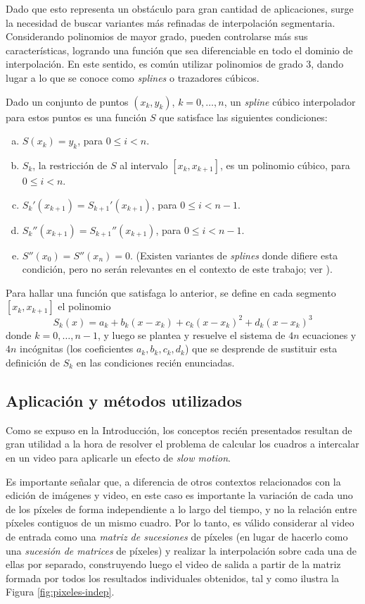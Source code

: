     Dado que esto representa un obstáculo para gran cantidad de aplicaciones, surge la necesidad de buscar variantes más refinadas de interpolación segmentaria. Considerando polinomios de mayor grado, pueden controlarse más sus características, logrando una función que sea diferenciable en todo el dominio de interpolación. En este sentido, es común utilizar polinomios de grado 3, dando lugar a lo que se conoce como \emph{splines} o trazadores cúbicos.

    Dado un conjunto de puntos $(x_k, y_k)$, $k = 0, \dots, n$, un \emph{spline} cúbico interpolador para estos puntos es una función $S$ que satisface las siguientes condiciones:

    \begin{enumerate}[(a)] \setlength{\leftskip}{2em}
      \item $S(x_k) = y_k$, para $0 \leq i < n$.
      \item $S_k$, la restricción de $S$ al intervalo $[x_k, x_{k+1}]$, es un polinomio cúbico, para $0 \leq i < n$.
      \item $S_k'(x_{k+1}) = S_{k+1}'(x_{k+1})$, para $0 \leq i < n - 1$.
      \item $S_k''(x_{k+1}) = S_{k+1}''(x_{k+1})$, para $0 \leq i < n - 1$.
      \item $S''(x_0) = S''(x_n) = 0$. (Existen variantes de \emph{splines} donde difiere esta condición, pero no serán relevantes en el contexto de este trabajo; ver \cite[p. 146]{Burden}).
    \end{enumerate}

    Para hallar una función que satisfaga lo anterior, se define en cada segmento $[x_k, x_{k+1}]$ el polinomio
      \[ S_k(x) = a_k + b_k (x - x_k) + c_k (x - x_k)^2 + d_k (x - x_k)^3 \]
    donde $k = 0, \dots, n-1$, y luego se plantea y resuelve el sistema de $4n$ ecuaciones y $4n$ incógnitas (los coeficientes $a_k, b_k, c_k, d_k$) que se desprende de sustituir esta definición de $S_k$ en las condiciones recién enunciadas.

  \subsection{Aplicación y métodos utilizados} 
    Como se expuso en la Introducción, los conceptos recién presentados resultan de gran utilidad a la hora de resolver el problema de calcular los cuadros a intercalar en un video para aplicarle un efecto de \emph{slow motion}.

    Es importante señalar que, a diferencia de otros contextos relacionados con la edición de imágenes y video, en este caso es importante la variación de cada uno de los píxeles de forma independiente a lo largo del tiempo,  y no la relación entre píxeles contiguos de un mismo cuadro. Por lo tanto, es válido considerar al video de entrada como una \emph{matriz de sucesiones} de píxeles (en lugar de hacerlo como una \emph{sucesión de matrices} de píxeles) y realizar la interpolación sobre cada una de ellas por separado, construyendo luego el video de salida a partir de la matriz formada por todos los resultados individuales obtenidos, tal y como ilustra la Figura \ref{fig:pixeles-indep}.

